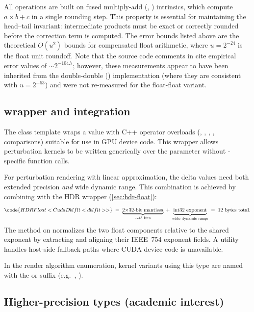 All operations are built on fused multiply-add (,
) intrinsics, which compute $a \times b + c$ in a single
rounding step.  This property is essential for maintaining the head--tail invariant:
intermediate products must be exact or correctly rounded before the correction
term is computed.  The error bounds listed above are the theoretical
$O(u^2)$ bounds for compensated float arithmetic, where $u = 2^{-24}$ is
the float unit roundoff.  Note that the source code comments in
 cite empirical error values of ${\sim}2^{-104.7}$;
however, these measurements appear to have been inherited from the
double-double () implementation (where they are consistent
with $u = 2^{-53}$) and were not re-measured for the float-float variant.

\subsection{ wrapper and  integration}
\label{subsec:ep-cudadblflt}

The  class template wraps a  value with
C++ operator overloads (\code{+}, \code{-}, \code{*}, \code{/}, comparisons)
suitable for use in GPU device code.  This wrapper allows perturbation kernels to be
written generically over the  parameter without
-specific function calls.

For perturbation rendering with linear approximation, the delta values need
both extended precision \emph{and} wide dynamic range.  This combination is achieved by
combining  with the HDR wrapper
(\cref{sec:hdr-float}):
\begingroup\footnotesize
\[
  \code{HDRFloat<CudaDblflt<dblflt>>} \;=\;
    \underbrace{\text{2$\times$32-bit mantissa}}_{\sim\text{48~bits}}
    \;+\;
    \underbrace{\text{int32 exponent}}_{\text{wide dynamic range}}
    \;=\; \text{12~bytes total.}
\]
\endgroup
The  method on  normalizes the two float
components relative to the shared exponent by extracting and aligning their
IEEE~754 exponent fields.  A  utility handles
host-side fallback paths where CUDA device code is unavailable.

In the render algorithm enumeration, kernel variants using this type are named
with the  or  suffix (e.g.\
, ).

\subsection{Higher-precision types (academic interest)}
\label{subsec:ep-higher-prec}

